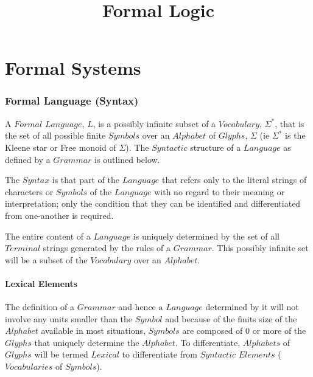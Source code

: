 \documentclass{article}
\begin{document}
\setcounter{tocdepth}{3}


\title{Formal Logic}
\date{}
\maketitle


\tableofcontents


\part{Formal Systems}

\section{Formal Language (Syntax)}

A $Formal$ $Language$, $L$, is a possibly infinite subset of a
$Vocabulary$, $\Sigma^*$, that is the set of all possible finite
$Symbols$ over an $Alphabet$ of $Glyphs$, $\Sigma$ (ie $\Sigma^*$ is
the Kleene star or Free monoid of $\Sigma$). The $Syntactic$ structure
of a $Language$ as defined by a $Grammar$ is outlined below.

The $Syntax$ is that part of the $Language$ that refers only to the
literal strings of characters or $Symbols$ of the $Language$ with no
regard to their meaning or interpretation; only the condition that
they can be identified and differentiated from one-another is
required.

The entire content of a $Language$ is uniquely determined by the set
of all $Terminal$ strings generated by the rules of a $Grammar$. This
possibly infinite set will be a subset of the $Vocabulary$ over an
$Alphabet$.

\subsection{Lexical Elements}

The definition of a $Grammar$ and hence a $Language$ determined by it
will not involve any units smaller than the $Symbol$ and because of
the finits size of the $Alphabet$ available in most situations,
$Symbols$ are composed of 0 or more of the $Glyphs$ that uniquely
determine the $Alphabet$. To differentiate, $Alphabets$ of $Glyphs$
will be termed $Lexical$ to differentiate from $Syntactic$ $Elements$
($Vocabularies$ of $Symbols$).
\end{document}
